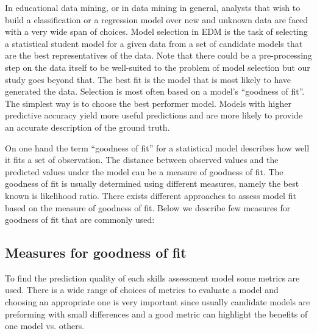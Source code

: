 In educational data mining, or in data mining in general, analysts that wish to build a classification or a regression model over new and unknown data are faced with a very wide span of choices. Model selection in EDM is the task of selecting a statistical student model for a given data from a set of candidate models that are the best representatives of the data. Note that there could be a pre-processing step on the data itself to be well-suited to the problem of model selection but our study goes beyond that. The best fit is the model that is most likely to have generated the data. Selection is most often based on a model's ``goodness of fit''. The simplest way is to choose the best performer model. Models with higher predictive accuracy yield more useful predictions and are more likely to provide an accurate description of the ground truth. 

On one hand the term ``goodness of fit''  for a statistical model describes how well it fits a set of observation. The distance between observed values and the predicted values under the model can be a measure of goodness of fit. The goodness of fit is usually determined using different measures, namely the best known is likelihood ratio. There exists different approaches to assess model fit based on the measure of goodness of fit. Below we describe few measures for goodness of fit that are commonly used:

\subsection{Measures for goodness of fit}

To find the prediction quality of each skills assessment model some metrics are used. There is a wide range of choices of metrics to evaluate a model and choosing an appropriate one is very important since usually candidate models are preforming with small differences and a good metric can highlight the benefits of one model vs. others.



